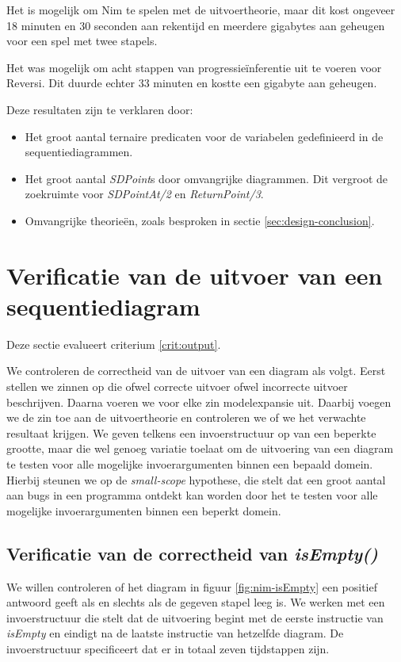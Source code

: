 Het is mogelijk om Nim te spelen met de uitvoertheorie, maar dit kost ongeveer 18 minuten en 30 seconden aan rekentijd en meerdere gigabytes aan geheugen voor een spel met twee stapels.

Het was mogelijk om acht stappen van progressie\"inferentie uit te voeren voor Reversi. Dit duurde echter 33 minuten en kostte een gigabyte aan geheugen.

Deze resultaten zijn te verklaren door:

\begin{itemize}
	\item Het groot aantal ternaire predicaten voor de variabelen gedefinieerd in de sequentiediagrammen.
	\item Het groot aantal \textit{SDPoint}s door omvangrijke diagrammen. Dit vergroot de zoekruimte voor \textit{SDPointAt/2} en \textit{ReturnPoint/3}.
	\item Omvangrijke theorie\"en, zoals besproken in sectie \ref{sec:design-conclusion}.
\end{itemize}

\section{Verificatie van de uitvoer van een sequentiediagram}\label{sec:verify-output}

Deze sectie evalueert criterium \ref{crit:output}.

We controleren de correctheid van de uitvoer van een diagram als volgt. Eerst stellen we zinnen op die ofwel correcte uitvoer ofwel incorrecte uitvoer beschrijven. Daarna voeren we voor elke zin modelexpansie uit. Daarbij voegen we de zin toe aan de uitvoertheorie en controleren we of we het verwachte resultaat krijgen. We geven telkens een invoerstructuur op van een beperkte grootte, maar die wel genoeg variatie toelaat om de uitvoering van een diagram te testen voor alle mogelijke invoerargumenten binnen een bepaald domein. Hierbij steunen we op de \textit{small-scope} hypothese\cite{andoni2003evaluating}, die stelt dat een groot aantal aan bugs in een programma ontdekt kan worden door het te testen voor alle mogelijke invoerargumenten binnen een beperkt domein.

\subsection{Verificatie van de correctheid van \textit{isEmpty()}}

We willen controleren of het diagram in figuur \ref{fig:nim-isEmpty} een positief antwoord geeft als en slechts als de gegeven stapel leeg is. We werken met een invoerstructuur die stelt dat de uitvoering begint met de eerste instructie van \textit{isEmpty} en eindigt na de laatste instructie van hetzelfde diagram. De invoerstructuur specificeert dat er in totaal zeven tijdstappen zijn.

